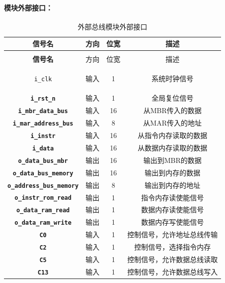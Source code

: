 \documentclass[lang=cn,a4paper,newtx]{elegantpaper}
\begin{document}
\paragraph{模块外部接口：}
\begin{longtable}{>{\bfseries}c c c c}
  \caption{外部总线模块外部接口} \\ 
  \toprule
  信号名 & 方向 & 位宽 & 描述 \\ 
  \midrule
  \endfirsthead

  \multicolumn{4}{l}{\textbf{（续表）外部总线模块外部接口}} \\ 
  \toprule
  信号名 & 方向 & 位宽 & 描述 \\ 
  \midrule
  \endhead

  \texttt{i\_clk} & 输入 & 1 & 系统时钟信号 \\ 
  \texttt{i\_rst\_n} & 输入 & 1 & 全局复位信号 \\ 
  \texttt{i\_mbr\_data\_bus} & 输入 & 16 & 从MBR传入的数据 \\ 
  \texttt{i\_mar\_address\_bus} & 输入 & 8 & 从MAR传入的地址 \\ 
  \texttt{i\_instr} & 输入 & 16 & 从指令内存读取的数据 \\ 
  \texttt{i\_data} & 输入 & 16 & 从数据内存读取的数据 \\ 
  \texttt{o\_data\_bus\_mbr} & 输出 & 16 & 输出到MBR的数据 \\ 
  \texttt{o\_data\_bus\_memory} & 输出 & 16 & 输出到内存的数据 \\ 
  \texttt{o\_address\_bus\_memory} & 输出 & 8 & 输出到内存的地址 \\ 
  \texttt{o\_instr\_rom\_read} & 输出 & 1 & 指令内存读使能信号 \\ 
  \texttt{o\_data\_ram\_read} & 输出 & 1 & 数据内存读使能信号 \\ 
  \texttt{o\_data\_ram\_write} & 输出 & 1 & 数据内存写使能信号 \\ 
  \texttt{C0} & 输入 & 1 & 控制信号，允许地址总线传输 \\ 
  \texttt{C2} & 输入 & 1 & 控制信号，选择指令内存 \\ 
  \texttt{C5} & 输入 & 1 & 控制信号，允许数据总线读取 \\ 
  \texttt{C13} & 输入 & 1 & 控制信号，允许数据总线写入 \\ 
  \bottomrule
\end{longtable}
\end{document}
